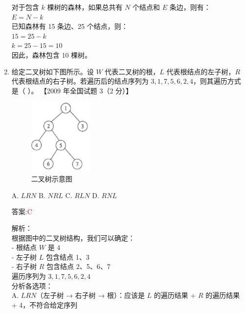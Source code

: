 \documentclass[lang=cn,newtx,10pt,scheme=chinese]{../../../elegantbook}
\begin{document}
\begin{enumerate}
        对于包含 $k$ 棵树的森林，如果总共有 $N$ 个结点和 $E$ 条边，则有：\\
        $E = N - k$\\
        
        已知森林有 15 条边、25 个结点，则：\\
        $15 = 25 - k$\\
        $k = 25 - 15 = 10$\\
        
        因此，森林包含 10 棵树。\\
    
        \item 给定二叉树如下图所示。设 $W$ 代表二叉树的根，$L$ 代表根结点的左子树，$R$ 代表根结点的右子树。若遍历后的结点序列为 $3, 1, 7, 5, 6, 2, 4$，则其遍历方式是（ ）。  
        【2009 年全国试题 3（2 分）】  
    
        \begin{figure}[h!]
                \centering
                \includegraphics[width=0.3\textwidth]{../../figure/exercisePicPDF/chapter6/6-9.pdf}
                \caption{二叉树示意图}
        \end{figure}
    
        A. $LRN$ \quad B. $NRL$ \quad C. $RLN$ \quad D. $RNL$  
    
        答案:\textcolor{red}{C}
        
        解析：\\
        根据图中的二叉树结构，我们可以确定：\\
        - 根结点 $W$ 是 4\\
        - 左子树 $L$ 包含结点 1、3\\
        - 右子树 $R$ 包含结点 2、5、6、7\\
        
        遍历序列为 $3, 1, 7, 5, 6, 2, 4$\\
        
        分析各选项：\\
        A. $LRN$（左子树 → 右子树 → 根）：应该是 $L$ 的遍历结果 + $R$ 的遍历结果 + 4，不符合给定序列\\
        

\end{enumerate}
\end{document}
